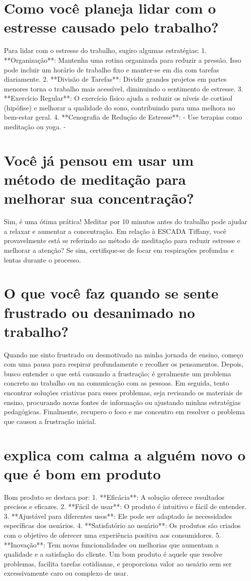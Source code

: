 \documentclass[11pt,a4paper]{article}
\begin{document}
\section{Como você planeja lidar com o estresse causado pelo trabalho?}
Para lidar com o estresse do trabalho, sugiro algumas estratégias: 1. **Organização**: Mantenha uma rotina organizada para reduzir a pressão. Isso pode incluir um horário de trabalho fixo e manter-se em dia com tarefas diariamente. 2. **Divisão de Tarefas**: Dividir grandes projetos em partes menores torna o trabalho mais acessível, diminuindo o sentimento de estresse. 3. **Exercício Regular**: O exercício físico ajuda a reduzir os níveis de cortisol (hipófise) e melhorar a qualidade do sono, contribuindo para uma melhora no bem-estar geral. 4. **Cenografia de Redução de Estresse**: - Use terapias como meditação ou yoga. -

\section{Você já pensou em usar um método de meditação para melhorar sua concentração?}
Sim, é uma ótima prática! Meditar por 10 minutos antes do trabalho pode ajudar a relaxar e aumentar a concentração. Em relação à ESCADA Tiffany, você provavelmente está se referindo ao método de meditação para reduzir estresse e melhorar a atenção? Se sim, certifique-se de focar em respirações profundas e lentas durante o processo.

\section{O que você faz quando se sente frustrado ou desanimado no trabalho?}
Quando me sinto frustrado ou desmotivado na minha jornada de ensino, começo com uma pausa para respirar profundamente e recolher os pensamentos. Depois, busco entender o que está causando a frustração; é geralmente um problema concreto no trabalho ou na comunicação com as pessoas. Em seguida, tento encontrar soluções criativas para esses problemas, seja revisando os materiais de ensino, procurando novas fontes de informação ou ajustando minhas estratégias pedagógicas. Finalmente, recupero o foco e me concentro em resolver o problema que causou a frustração inicial.

\section{explica com calma a alguém novo o que é bom em produto}
Bom produto se destaca por: 1. **Eficácia**: A solução oferece resultados precisos e eficazes. 2. **Fácil de usar**: O produto é intuitivo e fácil de entender. 3. **Ajustável para diferentes usos**: Ele pode ser adaptado às necessidades específicas dos usuários. 4. **Satisfatório ao usuário**: Os produtos são criados com o objetivo de oferecer uma experiência positiva aos consumidores. 5. **Inovação**: Tem novas funcionalidades ou melhorias que aumentam a qualidade e a satisfação do cliente. Um bom produto é aquele que resolve problemas, facilita tarefas cotidianas, e proporciona valor ao usuário sem ser excessivamente caro ou complexo de usar.
\end{document}
